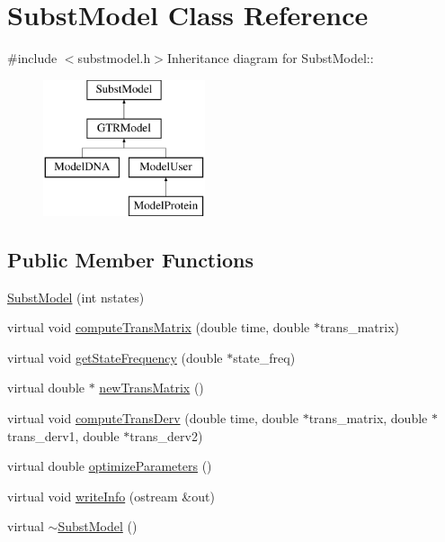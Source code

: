 \hypertarget{classSubstModel}{
\section{SubstModel Class Reference}
\label{classSubstModel}
}


{\ttfamily \#include $<$substmodel.h$>$}Inheritance diagram for SubstModel::\begin{figure}[H]
\begin{center}
\leavevmode
\includegraphics[height=4cm]{classSubstModel}
\end{center}
\end{figure}
\subsection*{Public Member Functions}
\begin{DoxyCompactItemize}
\item 
\hyperlink{classSubstModel_ad9629506c448db08c094f65569795242}{SubstModel} (int nstates)
\item 
virtual void \hyperlink{classSubstModel_a83997a2aaea95f2c994d88a9d1cb190e}{computeTransMatrix} (double time, double $\ast$trans\_\-matrix)
\item 
virtual void \hyperlink{classSubstModel_a18f98e25cacbd18e1b64b25d10a3e11f}{getStateFrequency} (double $\ast$state\_\-freq)
\item 
virtual double $\ast$ \hyperlink{classSubstModel_a3bea68a055833acb9dad99cb529681e5}{newTransMatrix} ()
\item 
virtual void \hyperlink{classSubstModel_ada88db5c6befc33de5ddb590667ba865}{computeTransDerv} (double time, double $\ast$trans\_\-matrix, double $\ast$trans\_\-derv1, double $\ast$trans\_\-derv2)
\item 
virtual double \hyperlink{classSubstModel_aa2d4bd724a699264b40dd5b2d129e29f}{optimizeParameters} ()
\item 
virtual void \hyperlink{classSubstModel_ac81144591a9eb6b6d9abc9e873a20af6}{writeInfo} (ostream \&out)
\item 
virtual \hyperlink{classSubstModel_accfa9c36ec87262ca1479fcdb4c95c3d}{$\sim$SubstModel} ()
\end{DoxyCompactItemize}
